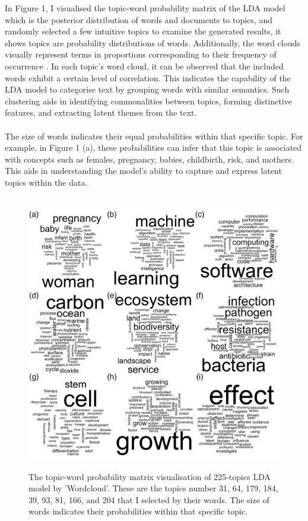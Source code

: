 \documentclass[12pt,twoside]{article}
\begin{document}
In Figure 1, I visualised the topic-word probability matrix of the LDA model which is the posterior distribution of words and documents to topics, and randomly selected a few intuitive topics to examine the generated results, it shows topics are probability distributions of words. Additionally, the word clouds visually represent terms in proportions corresponding to their frequency of occurrence \cite{vanAtteveldt2018}. In each topic's word cloud, it can be observed that the included words exhibit a certain level of correlation. This indicates the capability of the LDA model to categorise text by grouping words with similar semantics. Such clustering aids in identifying commonalities between topics, forming distinctive features, and extracting latent themes from the text.\\\\

The size of words indicates their equal probabilities within that specific topic. For example, in Figure 1 (a), these probabilities can infer that this topic is associated with concepts such as females, pregnancy, babies, childbirth, risk, and mothers. This aids in understanding the model's ability to capture and express latent topics within the data.\\\\

\begin{figure}[htbp]
    \centering
    \includegraphics[width=14cm]{./figures/IMG_5754}\\[0.15cm] 
    \caption{The topic-word probability matrix visualisation of 225-topics LDA model by 'Wordcloud'. These are the topics number 31, 64, 179, 184, 39, 93, 81, 166, and 204 that I selected by their words. The size of words indicates their probabilities within that specific topic.}

\end{figure}
\end{document}
